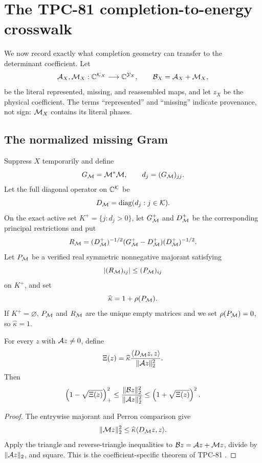 \section{The TPC-81 completion-to-energy crosswalk}
\label{sec:tpc81-crosswalk}

We now record exactly what completion geometry can transfer to the
determinant coefficient.  Let
\[
 \mathcal A_X,\mathcal M_X:\mathbb C^{\mathcal K_X}\longrightarrow\mathbb C^{\mathcal Y_X},
 \qquad
 \mathcal B_X=\mathcal A_X+\mathcal M_X,
\]
be the literal represented, missing, and reassembled maps, and let
\(z_X\) be the physical coefficient.  The terms ``represented'' and
``missing'' indicate provenance, not sign: \(\mathcal M_X\) contains its
literal phases.

\subsection{The normalized missing Gram}

Suppress \(X\) temporarily and define
\[
 G_{\mathcal M}=\mathcal M^*\mathcal M,\qquad
 d_j=(G_{\mathcal M})_{jj}.
\]
Let the full diagonal operator on \(\mathbb C^{\mathcal K}\) be
\[
 D_{\mathcal M}=\operatorname{diag}(d_j:j\in\mathcal K).
\]
On the exact active set \(K^+=\{j:d_j>0\}\), let
\(G_{\mathcal M}^+\) and \(D_{\mathcal M}^+\) be the corresponding principal
restrictions and put
\[
 R_{\mathcal M}=(D_{\mathcal M}^+)^{-1/2}
 (G_{\mathcal M}^+-D_{\mathcal M}^+)(D_{\mathcal M}^+)^{-1/2}.
\]
Let \(P_{\mathcal M}\) be a verified real symmetric nonnegative majorant
satisfying
\[
 |(R_{\mathcal M})_{ij}|\le (P_{\mathcal M})_{ij}
\]
on \(K^+\), and set
\[
 \widehat\kappa=1+\rho(P_{\mathcal M}).
\]
If \(K^+=\varnothing\), \(P_{\mathcal M}\) and \(R_{\mathcal M}\) are the unique
empty matrices and we set \(\rho(P_{\mathcal M})=0\), so
\(\widehat\kappa=1\).

\begin{proposition}
\label{prop:coefficient-survival}
For every \(z\) with \(\mathcal A z\ne0\), define
\begin{equation}
 \Xi(z)=
 \widehat\kappa
 \frac{\langle D_{\mathcal M}z,z\rangle}{\|\mathcal A z\|_2^2}.
\label{eq:Xi-audit}
\end{equation}
Then
\begin{equation}
 \left(1-\sqrt{\Xi(z)}\right)_+^2
 \le
 \frac{\|\mathcal B z\|_2^2}{\|\mathcal A z\|_2^2}
 \le
 \left(1+\sqrt{\Xi(z)}\right)^2.
\label{eq:coefficient-survival-audit}
\end{equation}
\end{proposition}

\begin{proof}
The entrywise majorant and Perron comparison give
\[
 \|\mathcal M z\|_2^2
 \le\widehat\kappa\langle D_{\mathcal M}z,z\rangle.
\]
Apply the triangle and reverse-triangle inequalities to
\(\mathcal B z=\mathcal A z+\mathcal M z\), divide by \(\|\mathcal A z\|_2\), and square.  This is the
coefficient-specific theorem of TPC-81 \citep{WangTPC81}.
\end{proof}

